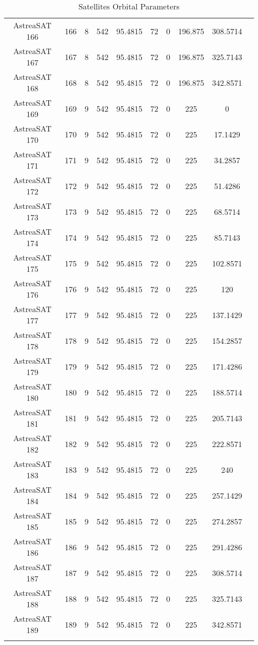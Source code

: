 \begin{longtable}{| c | c | c | c | c | c | c | c | c | c |}
AstreaSAT 166 & 166 & 8 & 542 & 95.4815 & 72 & 0 & 196.875 & 308.5714 \\ 
AstreaSAT 167 & 167 & 8 & 542 & 95.4815 & 72 & 0 & 196.875 & 325.7143 \\ 
AstreaSAT 168 & 168 & 8 & 542 & 95.4815 & 72 & 0 & 196.875 & 342.8571 \\ 
AstreaSAT 169 & 169 & 9 & 542 & 95.4815 & 72 & 0 & 225 & 0 \\ 
AstreaSAT 170 & 170 & 9 & 542 & 95.4815 & 72 & 0 & 225 & 17.1429 \\ 
AstreaSAT 171 & 171 & 9 & 542 & 95.4815 & 72 & 0 & 225 & 34.2857 \\ 
AstreaSAT 172 & 172 & 9 & 542 & 95.4815 & 72 & 0 & 225 & 51.4286 \\ 
AstreaSAT 173 & 173 & 9 & 542 & 95.4815 & 72 & 0 & 225 & 68.5714 \\ 
AstreaSAT 174 & 174 & 9 & 542 & 95.4815 & 72 & 0 & 225 & 85.7143 \\ 
AstreaSAT 175 & 175 & 9 & 542 & 95.4815 & 72 & 0 & 225 & 102.8571 \\ 
AstreaSAT 176 & 176 & 9 & 542 & 95.4815 & 72 & 0 & 225 & 120 \\ 
AstreaSAT 177 & 177 & 9 & 542 & 95.4815 & 72 & 0 & 225 & 137.1429 \\ 
AstreaSAT 178 & 178 & 9 & 542 & 95.4815 & 72 & 0 & 225 & 154.2857 \\ 
AstreaSAT 179 & 179 & 9 & 542 & 95.4815 & 72 & 0 & 225 & 171.4286 \\ 
AstreaSAT 180 & 180 & 9 & 542 & 95.4815 & 72 & 0 & 225 & 188.5714 \\ 
AstreaSAT 181 & 181 & 9 & 542 & 95.4815 & 72 & 0 & 225 & 205.7143 \\ 
AstreaSAT 182 & 182 & 9 & 542 & 95.4815 & 72 & 0 & 225 & 222.8571 \\ 
AstreaSAT 183 & 183 & 9 & 542 & 95.4815 & 72 & 0 & 225 & 240 \\ 
AstreaSAT 184 & 184 & 9 & 542 & 95.4815 & 72 & 0 & 225 & 257.1429 \\ 
AstreaSAT 185 & 185 & 9 & 542 & 95.4815 & 72 & 0 & 225 & 274.2857 \\
AstreaSAT 186 & 186 & 9 & 542 & 95.4815 & 72 & 0 & 225 & 291.4286 \\
AstreaSAT 187 & 187 & 9 & 542 & 95.4815 & 72 & 0 & 225 & 308.5714 \\
AstreaSAT 188 & 188 & 9 & 542 & 95.4815 & 72 & 0 & 225 & 325.7143 \\
AstreaSAT 189 & 189 & 9 & 542 & 95.4815 & 72 & 0 & 225 & 342.8571 \\ 	
\hline
\caption{Satellites Orbital Parameters}	
	
\end{longtable} 